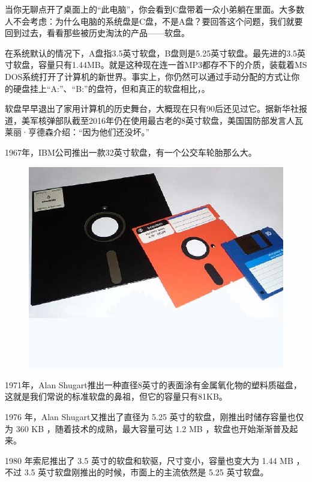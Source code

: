 \begin{multicols}{3}
当你无聊点开了桌面上的“此电脑”，你会看到C盘带着一众小弟躺在里面。大多数人不会考虑：为什么电脑的系统盘是C盘，不是A盘？要回答这个问题，我们就要回到过去，看看那些被历史淘汰的产品——软盘。

在系统默认的情况下，A盘指3.5英寸软盘，B盘则是5.25英寸软盘。最先进的3.5英寸软盘，容量只有1.44MB。就是这种现在连一首MP3都存不下的介质，装载着MS DOS系统打开了计算机的新世界。事实上，你仍然可以通过手动分配的方式让你的硬盘挂上“A:”、“B:”的盘符，但和真正的软盘相比，。

软盘早早退出了家用计算机的历史舞台，大概现在只有90后还见过它。据新华社报道，美军核弹部队截至2016年仍在使用最古老的8英寸软盘，美国国防部发言人瓦莱丽·亨德森介绍：“因为他们还没坏。”

1967年，IBM公司推出一款32英寸软盘，有一个公交车轮胎那么大。

\begin{figure}[H]
    \centering
    \includegraphics[width=\linewidth,clip=true,trim=0 140 0 0]{IMG/202001/floppy.jpg}
\end{figure}

1971年，Alan Shugart推出一种直径8英寸的表面涂有金属氧化物的塑料质磁盘，这就是我们常说的标准软盘的鼻祖，但它的容量只有81KB。

1976 年，Alan Shugart又推出了直径为 5.25 英寸的软盘，刚推出时储存容量也仅为 360 KB ，随着技术的成熟，最大容量可达 1.2 MB ，软盘也开始渐渐普及起来。

1980 年索尼推出了 3.5 英寸的软盘和软驱，尺寸变小，容量也变大为 1.44 MB ，不过 3.5 英寸软盘刚推出的时候，市面上的主流依然是 5.25 英寸软盘。


\end{multicols}
